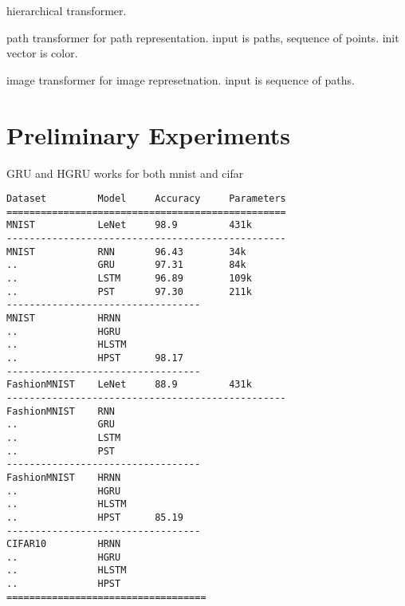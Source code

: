 \documentclass[10pt,twocolumn,letterpaper]{article}
\begin{document}
hierarchical transformer.

path transformer for path representation. input is paths, sequence of points. init vector is color.

image transformer for image represetnation. input is sequence of paths.

\section{Preliminary Experiments}

GRU and HGRU works for both mnist and cifar

\begin{verbatim}
Dataset         Model     Accuracy     Parameters
=================================================
MNIST           LeNet     98.9         431k
-------------------------------------------------
MNIST           RNN       96.43        34k
..              GRU       97.31        84k
..              LSTM      96.89        109k
..              PST       97.30        211k
----------------------------------
MNIST           HRNN
..              HGRU
..              HLSTM
..              HPST      98.17
----------------------------------
FashionMNIST    LeNet     88.9         431k
-------------------------------------------------
FashionMNIST    RNN
..              GRU
..              LSTM
..              PST
----------------------------------
FashionMNIST    HRNN
..              HGRU
..              HLSTM
..              HPST      85.19
----------------------------------
CIFAR10         HRNN
..              HGRU
..              HLSTM
..              HPST
===================================
\end{verbatim}


{\small


}
\end{document}
